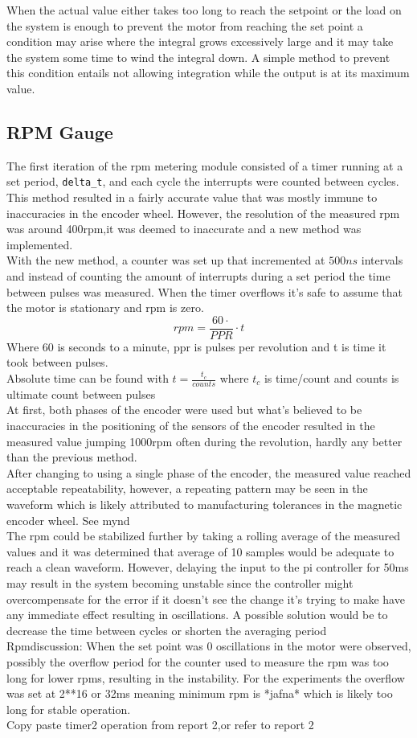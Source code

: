 \documentclass{article}
\begin{document}
When the actual value either takes too long to reach the setpoint or the load on the system is enough to prevent the motor from reaching the set point a condition may arise where the integral grows excessively large and it may take the system some time to wind the integral down. A simple method  to prevent this condition entails not allowing integration while the output is at its maximum value.

\subsection{RPM Gauge}

The first iteration of the rpm metering module consisted of a timer running at a set period, \verb!delta_t!, and each cycle the interrupts were counted between cycles. This method resulted in a fairly accurate value that was mostly immune to inaccuracies in the encoder wheel. However, the resolution of the measured rpm was around 400rpm,it was deemed to inaccurate and a new method was implemented.
\\
With the new method, a counter was set up that incremented at $500ns$ intervals and instead of counting the amount of interrupts during a set period the time between pulses was measured. When the timer overflows it's safe to assume that the motor is stationary and rpm is zero. 
\[ rpm=\frac{60\cdot} {PPR} \cdot t\]
Where 60 is seconds to a minute, ppr is pulses per revolution and t is time it took between pulses. 
\\
Absolute time can be found with \(t = \frac{t_c}{counts}\)  where $t_c$ is time/count and counts is ultimate count between pulses 
\\
At first, both phases of the encoder were used but what's believed to be inaccuracies in the positioning of the sensors of the encoder resulted in the measured value jumping 1000rpm often during the revolution, hardly any better than the previous method.
\\
After changing to using a single phase of the encoder, the measured value reached acceptable repeatability, however, a repeating pattern may be seen in the waveform which is  likely attributed to manufacturing tolerances in the magnetic encoder wheel. See mynd
\\
The rpm could be stabilized further by taking a rolling average of the measured values and it was determined that average of 10 samples would be adequate to reach a clean waveform. However, delaying the input to the pi controller for 50ms may result in the system becoming unstable since the controller might overcompensate for the error if it doesn't see the change it's trying to make have any immediate effect resulting in oscillations. A possible solution would be to decrease the time between cycles or shorten the averaging period
\\
Rpmdiscussion:
When the set point was 0 oscillations in the motor were observed, possibly the overflow period for the counter used to measure the rpm was too long for lower rpms, resulting in the instability. For the experiments the overflow was set at 2**16 or 32ms meaning minimum rpm is *jafna* which is likely too long for stable operation. 
\\
Copy paste timer2 operation from report 2,or refer to report 2
\end{document}
